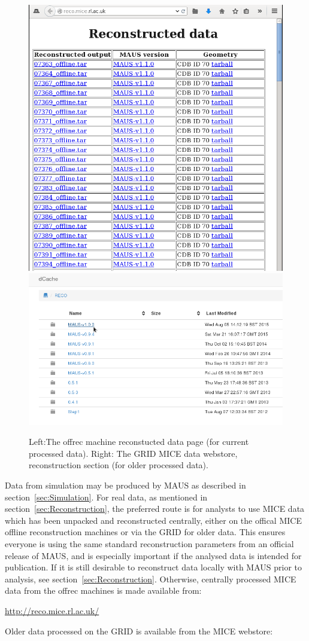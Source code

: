 \documentclass[a4paper,10pt]{article}
\begin{document}
  \begin{figure}[tbh]
    \begin{center}
      \includegraphics[width=0.34\linewidth]{./graphics/OffRecReconWebStore.png} \hspace{5mm}
      \includegraphics[width=0.6\linewidth]{./graphics/WebStoreReco.png}
      \caption{Left:The offrec machine reconstucted data page (for current processed data). Right: The GRID MICE data webstore, reconstruction section (for older processed data).}
      \label{fig:WebStoreReco}
    \end{center}
  \end{figure}

  Data from simulation may be produced by MAUS as described in section~\ref{sec:Simulation}.  For real data, as mentioned in section~\ref{sec:Reconstruction}, the preferred route is for analysts to use MICE data which has been unpacked and reconstructed centrally, either on the offical MICE offline reconstruction machines or via the GRID for older data.  This ensures everyone is using the same standard reconstruction parameters from an official release of MAUS, and is especially important if the analysed data is intended for publication. If it is still desirable to reconstruct data locally with MAUS prior to analysis, see section~\ref{sec:Reconstruction}.  Otherwise, centrally processed MICE data from the offrec machines is made available from:

  \url{http://reco.mice.rl.ac.uk/}

  Older data processed on the GRID is available from the MICE webstore:
\end{document}
